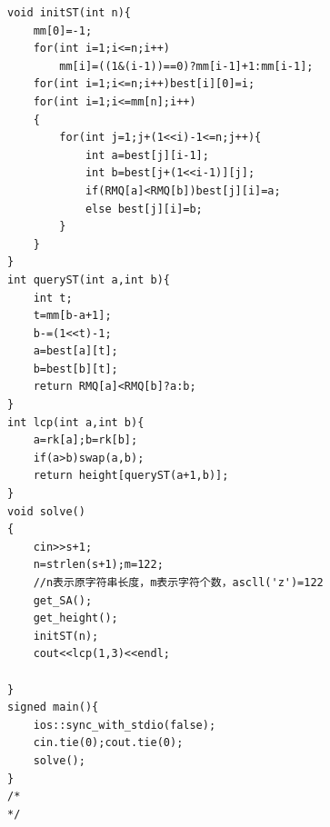\documentclass[12pt, a4paper, oneside]{ctexart}
\begin{document}
\begin{lstlisting}
void initST(int n){
	mm[0]=-1;
	for(int i=1;i<=n;i++)
		mm[i]=((1&(i-1))==0)?mm[i-1]+1:mm[i-1];
	for(int i=1;i<=n;i++)best[i][0]=i;
	for(int i=1;i<=mm[n];i++)
	{
		for(int j=1;j+(1<<i)-1<=n;j++){
			int a=best[j][i-1];
			int b=best[j+(1<<i-1)][j];
			if(RMQ[a]<RMQ[b])best[j][i]=a;
			else best[j][i]=b;
		}
	}
}
int queryST(int a,int b){
	int t;
	t=mm[b-a+1];
	b-=(1<<t)-1;
	a=best[a][t];
	b=best[b][t];
	return RMQ[a]<RMQ[b]?a:b;
}
int lcp(int a,int b){
	a=rk[a];b=rk[b];
	if(a>b)swap(a,b);
	return height[queryST(a+1,b)];
}
void solve()
{
    cin>>s+1;
    n=strlen(s+1);m=122;
	//n表示原字符串长度，m表示字符个数，ascll('z')=122 
    get_SA();
    get_height();
    initST(n);
    cout<<lcp(1,3)<<endl;

}
signed main(){
	ios::sync_with_stdio(false);
	cin.tie(0);cout.tie(0);
	solve();
}
/*
*/
\end{lstlisting}





\newpage
\end{document}
